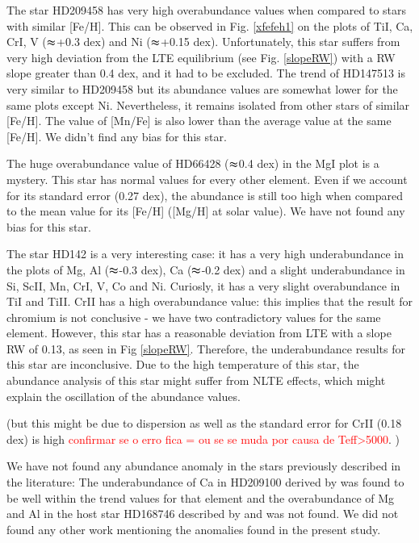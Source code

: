\documentclass[dvips,12pt,a4paper]{report}
\begin{document}
{{The star HD209458 has very high overabundance values when compared to stars with similar [Fe/H]. This can be observed in Fig. \ref{xfefeh1} on the plots of TiI, Ca, CrI, V ($\thickapprox$+0.3 dex) and Ni ($\thickapprox$+0.15 dex). Unfortunately, this star suffers from very high deviation from the LTE equilibrium (see Fig. \ref{slopeRW}) with a RW slope greater than 0.4 dex, and it had to be excluded. %
The trend of HD147513 is very similar to HD209458 but its abundance values are somewhat lower for the same plots except Ni. Nevertheless, it remains isolated from other stars of similar [Fe/H]. The value of [Mn/Fe] is also lower than the average value at the same [Fe/H]. We didn't find any bias for this star.

The huge overabundance value of HD66428 ($\thickapprox$0.4 dex) in the MgI plot is a mystery. This star has normal values for every other element. Even if we account for its standard error (0.27 dex), the abundance is still too high when compared to the mean value for its [Fe/H] ([Mg/H] at solar value). We have not found any bias for this star.

The star HD142 is a very interesting case: it has a very high underabundance in the plots of Mg, Al ($\thickapprox$-0.3 dex), Ca ($\thickapprox$-0.2 dex) and a slight underabundance in Si, ScII, Mn, CrI, V, Co and Ni. Curiosly, it has a very slight overabundance in TiI and TiII. CrII has a high overabundance value: this implies that the result for chromium is not conclusive - we have two contradictory values for the same element. However, this star has a reasonable deviation from LTE with a slope RW of 0.13, as seen in Fig \ref{slopeRW}. Therefore, the underabundance results for this star are inconclusive. Due to the high temperature of this star, the abundance analysis of this star might suffer from NLTE effects, which might explain the oscillation of the abundance values.

 (but this might be due to dispersion as well as the standard error for CrII (0.18 dex) is high \textcolor{red}{confirmar se o erro fica = ou se se muda por causa de Teff>5000}. )

We have not found any abundance anomaly in the stars previously described in the literature: The underabundance of Ca in HD209100 derived by \citet{Bodaghee-2003} was found to be well within the trend values for that element and the overabundance of Mg and Al in the host star HD168746 described by \citet{Gilli-2006} and \citet{Sadakane-2002} was not found. We did not found any other work mentioning the anomalies found in the present study.

}}
\end{document}

